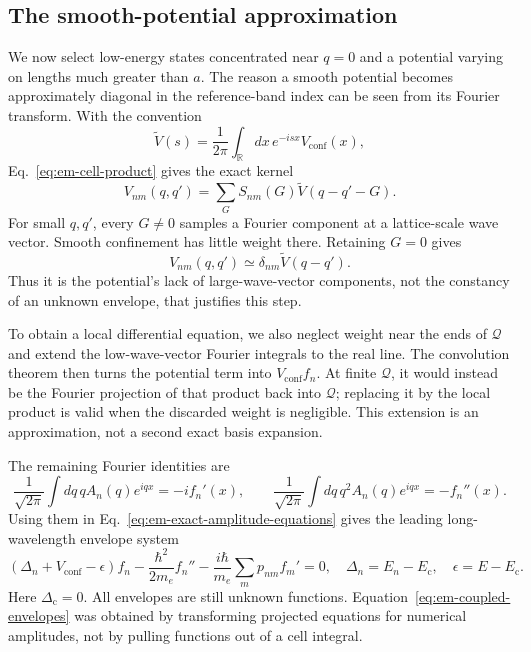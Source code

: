 \subsection{The smooth-potential approximation}
\label{sec:em-smooth-potential}

We now select low-energy states concentrated near $q=0$ and
a potential varying on lengths much greater than $a$.
The reason a smooth potential becomes approximately diagonal
in the reference-band index can be seen from its Fourier transform.
With the convention
\begin{equation}
  \widetilde V(s)=\frac1{2\pi}\int_{\mathbb R}dx\,
                  e^{-isx}V_{\mathrm{conf}}(x),
  \label{eq:em-potential-fourier}
\end{equation}
Eq.~\eqref{eq:em-cell-product} gives the exact kernel
\begin{equation}
  V_{nm}(q,q')=\sum_G S_{nm}(G)
                           \widetilde V(q-q'-G).
  \label{eq:em-potential-reciprocal-sum}
\end{equation}
For small $q,q'$, every $G\ne0$ samples a Fourier component
at a lattice-scale wave vector. Smooth confinement has little
weight there. Retaining $G=0$ gives
\begin{equation}
  V_{nm}(q,q')\simeq\delta_{nm}\widetilde V(q-q').
  \label{eq:em-smooth-kernel}
\end{equation}
Thus it is the potential's lack of large-wave-vector components,
not the constancy of an unknown envelope, that justifies this step.

To obtain a local differential equation, we also neglect weight
near the ends of $\mathcal Q$ and extend the low-wave-vector
Fourier integrals to the real line. The convolution theorem then
turns the potential term into $V_{\mathrm{conf}}f_n$.
At finite $\mathcal Q$, it would instead be the Fourier projection
of that product back into $\mathcal Q$; replacing it by the
local product is valid when the discarded weight is negligible.
This extension is an approximation, not a second exact basis expansion.

The remaining Fourier identities are
\[
  \frac1{\sqrt{2\pi}}\int dq\,qA_n(q)e^{iqx}=-if_n'(x),
  \qquad
  \frac1{\sqrt{2\pi}}\int dq\,q^2A_n(q)e^{iqx}=-f_n''(x).
\]
Using them in Eq.~\eqref{eq:em-exact-amplitude-equations} gives
the leading long-wavelength envelope system
\begin{equation}
  (\Delta_n+V_{\mathrm{conf}}-\epsilon)f_n
     -\frac{\hbar^2}{2m_e}f_n''
     -\frac{i\hbar}{m_e}\sum_m p_{nm}f_m'=0,
  \quad
  \Delta_n=E_n-E_{\mathrm c},\quad \epsilon=E-E_{\mathrm c}.
  \label{eq:em-coupled-envelopes}
\end{equation}
Here $\Delta_{\mathrm c}=0$. All envelopes are still unknown
functions. Equation~\eqref{eq:em-coupled-envelopes} was obtained
by transforming projected equations for numerical amplitudes,
not by pulling functions out of a cell integral.

